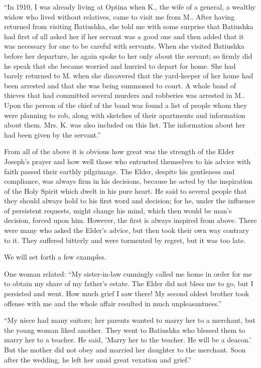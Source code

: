 “In 1910, I was already living at Optina when K., the wife of a general, a wealthy widow who lived without relatives, came to visit me from M.. After having returned from visiting Batiushka, she told me with some surprise that Batiushka had first of all asked her if her servant was a good one and then added that it was necessary for one to be careful with servants. When she visited Batiushka before her departure, he again spoke to her only about the servant; so firmly did he speak that she became worried and hurried to depart for home. She had barely returned to M. when she discovered that the yard-keeper of her home had been arrested and that she was being summoned to court. A whole band of thieves that had committed several murders and robberies was arrested in M.. Upon the person of the chief of the band was found a list of people whom they were planning to rob, along with sketches of their apartments and information about them. Mrs. K. was also included on this list. The information about her had been given by the servant.”

From all of the above it is obvious how great was the strength of the Elder Joseph's prayer and how well those who entrusted themselves to his advice with faith passed their earthly pilgrimage. The Elder, despite his gentleness and compliance, was always firm in his decisions, because he acted by the inspiration of the Holy Spirit which dwelt in his pure heart. He said to several people that they should always hold to his first word and decision; for he, under the influence of persistent requests, might change his mind, which then would be man's decision, forced upon him. However, the first is always inspired from above. There were many who asked the Elder's advice, but then took their own way contrary to it. They suffered bitterly and were tormented by regret, but it was too late.

We will set forth a few examples.

\vspace{1cm}

One woman related: “My sister-in-law cunningly called me home in order for me to obtain my share of my father's estate. The Elder did not bless me to go, but I persisted and went. How much grief I saw there! My second oldest brother took offense with me and the whole affair resulted in much unpleasantness.''

“My niece had many suitors; her parents wanted to marry her to a merchant, but the young woman liked another. They went to Batiushka who blessed them to marry her to a teacher. He said, 'Marry her to the teacher. He will be a deacon.' But the mother did not obey and married her daughter to the merchant. Soon after the wedding, he left her amid great vexation and grief.”

